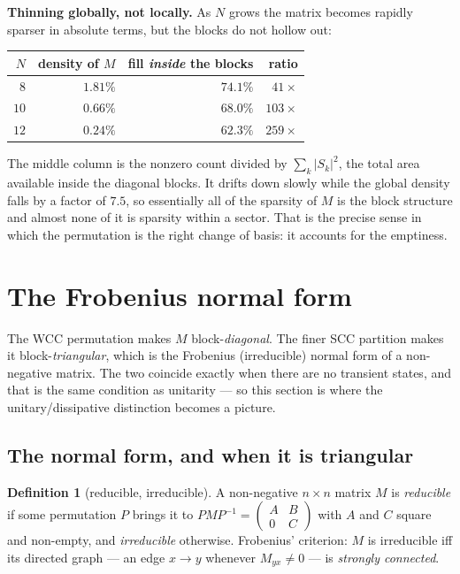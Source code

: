 \documentclass[11pt]{article}
\theoremstyle{plain}
\theoremstyle{definition}
\newtheorem{definition}{Definition}
\begin{document}
\noindent\textbf{Thinning globally, not locally.} As $N$ grows the matrix becomes
rapidly sparser in absolute terms, but the blocks do not hollow out:

\begin{center}\small
\begin{tabular}{rrrr}
\toprule
$N$ & density of $M$ & fill \emph{inside} the blocks & ratio \\
\midrule
$8$  & $1.81\%$ & $74.1\%$ & $41\times$ \\
$10$ & $0.66\%$ & $68.0\%$ & $103\times$ \\
$12$ & $0.24\%$ & $62.3\%$ & $259\times$ \\
\bottomrule
\end{tabular}
\end{center}

\noindent The middle column is the nonzero count divided by $\sum_k |S_k|^2$, the
total area available inside the diagonal blocks. It drifts down slowly while the
global density falls by a factor of $7.5$, so essentially all of the sparsity of
$M$ is the block structure and almost none of it is sparsity within a sector.
That is the precise sense in which the permutation is the right change of basis:
it accounts for the emptiness.

\section{The Frobenius normal form}
\label{sec:frobenius}

The WCC permutation makes $M$ block-\emph{diagonal}. The finer SCC partition
makes it block-\emph{triangular}, which is the Frobenius (irreducible) normal
form of a non-negative matrix. The two coincide exactly when there are no
transient states, and that is the same condition as unitarity --- so this
section is where the unitary/dissipative distinction becomes a picture.

\subsection{The normal form, and when it is triangular}
\label{sec:frobdef}

\begin{definition}[reducible, irreducible]
A non-negative $n\times n$ matrix $M$ is \emph{reducible} if some permutation
$P$ brings it to
$PMP^{-1}=\left(\begin{smallmatrix} A & B \\ 0 & C\end{smallmatrix}\right)$
with $A$ and $C$ square and non-empty, and \emph{irreducible} otherwise.
Frobenius' criterion: $M$ is irreducible iff its directed graph --- an edge
$x\to y$ whenever $M_{yx}\neq0$ --- is \emph{strongly connected}.
\end{definition}
\end{document}
